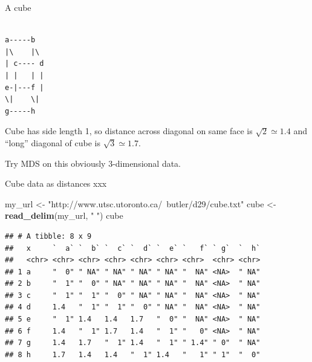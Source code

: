\documentclass[ignorenonframetext,]{beamer}
\newenvironment{Shaded}{\begin{snugshade}}{\end{snugshade}}
\newcommand{\KeywordTok}[1]{\textcolor[rgb]{0.13,0.29,0.53}{\textbf{#1}}}
\newcommand{\NormalTok}[1]{#1}
\newcommand{\StringTok}[1]{\textcolor[rgb]{0.31,0.60,0.02}{#1}}
\begin{document}
\begin{frame}[fragile]{A cube}
\protect\hypertarget{a-cube}{}

\begin{verbatim}

a-----b
|\    |\
| c---- d
| |   | |
e-|---f |
\|    \|
g-----h
\end{verbatim}

Cube has side length 1, so distance across diagonal on same face is
\(\sqrt{2}\simeq 1.4\) and ``long'' diagonal of cube is
\(\sqrt{3}\simeq 1.7\). \vspace{3ex}

Try MDS on this obviously 3-dimensional data.

\end{frame}

\begin{frame}[fragile]{Cube data as distances xxx}
\protect\hypertarget{cube-data-as-distances-xxx}{}

\footnotesize

\begin{Shaded}
\begin{Highlighting}[]
\NormalTok{my_url <-}\StringTok{ "http://www.utsc.utoronto.ca/~butler/d29/cube.txt"}
\NormalTok{cube <-}\StringTok{ }\KeywordTok{read_delim}\NormalTok{(my_url, }\StringTok{" "}\NormalTok{)}
\NormalTok{cube}
\end{Highlighting}
\end{Shaded}

\begin{verbatim}
## # A tibble: 8 x 9
##   x     `  a` `  b` `  c` `  d` `  e` `   f` ` g`  `  h`
##   <chr> <chr> <chr> <chr> <chr> <chr> <chr>  <chr> <chr>
## 1 a     "  0" " NA" " NA" " NA" " NA" "  NA" <NA>  " NA"
## 2 b     "  1" "  0" " NA" " NA" " NA" "  NA" <NA>  " NA"
## 3 c     "  1" "  1" "  0" " NA" " NA" "  NA" <NA>  " NA"
## 4 d     1.4   "  1" "  1" "  0" " NA" "  NA" <NA>  " NA"
## 5 e     "  1" 1.4   1.4   1.7   "  0" "  NA" <NA>  " NA"
## 6 f     1.4   "  1" 1.7   1.4   "  1" "   0" <NA>  " NA"
## 7 g     1.4   1.7   "  1" 1.4   "  1" " 1.4" " 0"  " NA"
## 8 h     1.7   1.4   1.4   "  1" 1.4   "   1" " 1"  "  0"
\end{verbatim}

\normalsize

\end{frame}
\end{document}
